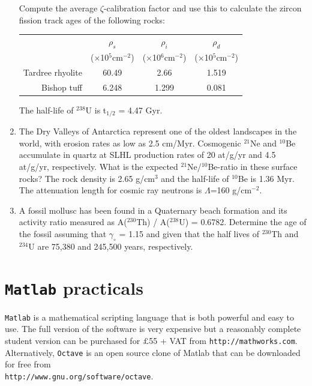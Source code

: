 \documentclass{book}
\begin{document}
\begin{enumerate}
Compute the average $\zeta$-calibration factor and use this to
calculate the zircon fission track ages of the following rocks:

\begin{table}[!ht]
\centering
\begin{tabular}{r@{~}c@{~}c@{~}c}
~ & $\rho_s$ & $\rho_i$ & $\rho_d$ \\
~ & ($\times$10$^5$cm$^{-2}$) & ($\times$10$^6$cm$^{-2}$) & ($\times$10$^5$cm$^{-2}$)\\
\hline
Tardree rhyolite & 60.49 & 2.66 & 1.519 \\
Bishop tuff & 6.248 & 1.299 & 0.081 \\
\end{tabular}
\end{table}

The half-life of $^{238}$U is t$_{1/2}$ = 4.47 Gyr.\\

\item The Dry Valleys of Antarctica represent one of the oldest
  landscapes in the world, with erosion rates as low as 2.5
  cm/Myr. Cosmogenic $^{21}$Ne and $^{10}$Be accumulate in quartz at
  SLHL production rates of 20 at/g/yr and 4.5 at/g/yr,
  respectively. What is the expected $^{21}$Ne/$^{10}$Be-ratio in
  these surface rocks? The rock density is 2.65 g/cm$^{3}$ and the
  half-life of $^{10}$Be is 1.36 Myr. The attenuation length for
  cosmic ray neutrons is $\Lambda$=160
  g/cm$^{-2}$. 

\item A fossil mollusc has been found in a Quaternary beach formation
  and its activity ratio measured as A($^{230}$Th) / A($^{238}$U) =
  0.6782. Determine the age of the fossil assuming that $\gamma_\circ$
  = 1.15 and given that the half lives of $^{230}$Th and $^{234}$U are
  75,380 and 245,500 years,
  respectively. 

\end{enumerate}

\chapter{{\tt Matlab} practicals}
\label{sec:programming}

{\tt Matlab} is a mathematical scripting language that is both
powerful and easy to use. The full version of the software is very
expensive but a reasonably complete student version can be purchased
for $\pounds$55 + VAT from {\tt http://mathworks.com}. Alternatively,
{\tt Octave} is an open source clone of Matlab that can be downloaded
for free from\\ {\tt http://www.gnu.org/software/octave}.
\end{document}
